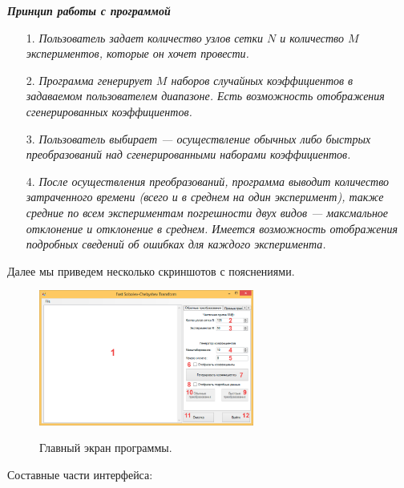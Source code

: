 \begin{center}
	\textbf{\textit{Принцип работы с программой}}
\end{center}
\begin{enumerate}
	\item[1.] \textit{
		Пользователь задает количество узлов сетки $N$ и количество $M$ экспериментов, которые он хочет провести.
	}
	\item[2.] \textit{
		Программа генерирует $M$ наборов случайных коэффициентов в задаваемом пользователем диапазоне. Есть возможность отображения сгенерированных коэффициентов.
	}
	\item[3.] \textit{
		Пользователь выбирает --- осуществление обычных либо быстрых преобразований над сгенерированными наборами коэффициентов.
	}
	\item[4.] \textit{
		После осуществления преобразований, программа выводит количество затраченного времени (всего и в среднем на один эксперимент), также средние по всем экспериментам погрешности двух видов --- максмальное отклонение и отклонение в среднем.
		Имеется возможность отображения подробных сведений об ошибках для каждого эксперимента.
	}
\end{enumerate}

Далее мы приведем несколько скриншотов с пояснениями.

\begin{figure}[H]
	\begin{center}
		\includegraphics[width=200pt]{pictures/sms-stn-1(1)}\\
		\caption{Главный экран программы.}\label{sms-stn-1-img1}
	\end{center}
\end{figure}

Составные части интерфейса:

